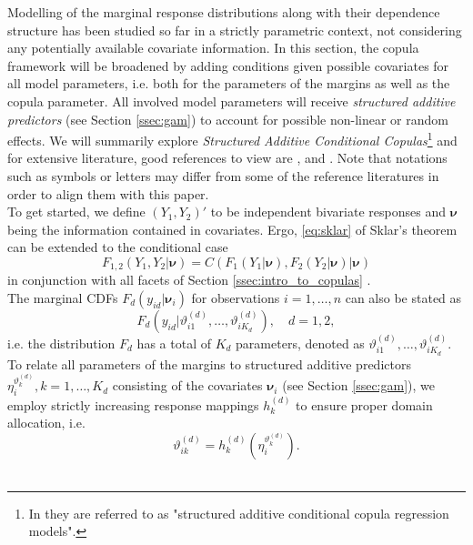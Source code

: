 
Modelling of the marginal response distributions along with their dependence structure has been studied so far in a strictly parametric context, not considering any potentially available covariate information. In this section, the copula framework will be broadened by adding conditions given possible covariates for all model parameters, i.e. both for the parameters of the margins as well as the copula parameter. All involved model parameters will receive \textit{structured additive predictors} (see Section \ref{ssec:gam}) to account for possible non-linear or random effects. We will summarily explore \textit{Structured Additive Conditional Copulas}\footnote{In \cite{klein2016simultaneous} they are referred to as "structured additive conditional copula regression models".} and for extensive literature, good references to view are \cite{klein2016simultaneous}, \cite{marra1605bivariate} and \cite{vatter2019gamcopula}. Note that notations such as symbols or letters may differ from some of the reference literatures in order to align them with this paper. \\

To get started, we define $(Y_1, Y_2)'$ to be independent bivariate responses and $\bm{\nu}$ being the information contained in covariates. Ergo, \autoref{eq:sklar} of Sklar's theorem can be extended to the conditional case
\begin{equation}
F_{1,2}\left(Y_{1}, Y_{2} | \bm{\nu} \right)=C\left(F_{1}\left(Y_{1} | \bm{\nu} \right), F_{2}\left(Y_{2} | \bm{\nu} \right) | \bm{\nu} \right)
\label{eq:sklar_conditional}
\end{equation}
in conjunction with all facets of Section \ref{ssec:intro_to_copulas} \citep{patton2006modelling}.\\
The marginal \acp{CDF} $F_{d}\left(y_{i d} | \bm{\nu}_i\right)$ for observations $i = 1,\ldots, n$ can also be stated as
\begin{equation}
F_{d}\left(y_{i d} | \vartheta_{i 1}^{(d)}, \ldots, \vartheta_{i K_{d}}^{(d)}\right), \quad d = 1, 2,
\end{equation}
i.e. the distribution $F_d$ has a total of $K_d$ parameters, denoted as $\vartheta_{i 1}^{(d)}, \ldots, \vartheta_{i K_{d}}^{(d)}$.
To relate all parameters of the margins to structured additive predictors $\eta_i^{\vartheta_k^{(d)}},  k = 1,\ldots, K_d$ consisting of the covariates $\bm{\nu}_i$ (see Section \ref{ssec:gam}), we employ strictly increasing response mappings $h_k^{(d)}$ to ensure proper domain allocation, i.e.
\begin{equation}
\vartheta_{i k}^{(d)}=h_{k}^{(d)}(\eta_{i}^{\vartheta_{k}^{(d)}}).
\label{eq:parameter_mapping}
\end{equation}
\\

